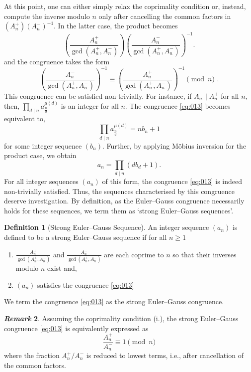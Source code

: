 \documentclass{article}
\numberwithin{equation}{section}
\theoremstyle{definition}
\newtheorem{definition}{\bf {Definition}}[section]
\newtheorem{remark}[definition]{\it Remark}
\begin{document}
At this point, one can either simply relax the coprimality condition or, instead, compute the inverse modulo $n$ only after cancelling the common factors in $(A_n^+)(A_n^-)^{-1}$. In the latter case, the product becomes
\[
\left(\frac{A_n^+}{\gcd(A_n^+,A_n^-)}\right)
\left(\frac{A_n^-}{\gcd(A_n^+,A_n^-)}\right)^{-1}.
\]
and the congruence takes the form
\begin{equation}\label{eq:013}
    \left(\frac{A_n^-}{\gcd(A_n^+,A_n^-)}\right)^{-1}\equiv\left(\frac{A_n^+}{\gcd(A_n^+,A_n^-)}\right)^{-1}\pmod{n}\text{ .}
\end{equation}
This congruence can be satisfied non-trivially. For instance, if $A_n^-\mid A_n^+$ for all $n$, then, $\prod_{d\mid n}a_\frac{n}{d}^{\mu(d)}$ is an integer for all $n$. The congruence \eqref{eq:013} becomes equivalent to, 
\[\prod_{d\mid n}a_\frac{n}{d}^{\mu(d)}=nb_n+1\]
for some integer sequence $(b_n)$. Further, by applying M\"{o}bius inversion for the product case, we obtain 
\begin{equation}\label{eq:014}
    a_n=\prod_{d\mid n}(db_d+1)\text{.}
\end{equation}
For all integer sequences $(a_n)$ of this form, the congruence \eqref{eq:013} is indeed non-trivially satisfied. Thus, the sequences characterised by this congruence deserve investigation. By definition, as the Euler--Gauss congruence necessarily holds for these sequences, we term them as `strong Euler--Gauss sequences'.
\begin{definition}[Strong Euler--Gauss Sequence]\label{defn:strongEG}
    An integer sequence $(a_n)$ is defined to be a strong Euler--Gauss sequence if for all $n\geq1$  
    \begin{enumerate}[label=\roman*.]
        \item $\frac{A_n^+}{\gcd(A_n^+,A_n^-)}$ and $\frac{A_n^-}{\gcd(A_n^+,A_n^-)}$ are each coprime to $n$ so that their inverses modulo $n$ exist and, 
        \item $(a_n)$ satisfies the congruence \eqref{eq:013}
    \end{enumerate}
We term the congruence \eqref{eq:013} as the strong Euler--Gauss congruence. 
\end{definition}
\begin{remark}\label{rem:01}
    Assuming the coprimality condition (i.), the strong Euler--Gauss congruence \eqref{eq:013} is equivalently expressed as
    \[\frac{A_n^+}{A_n^-}\equiv 1\pmod{n}\]
    where the fraction $A_n^+/A_n^-$ is reduced to lowest terms, i.e., after cancellation of the common factors. 
\end{remark}
\end{document}
